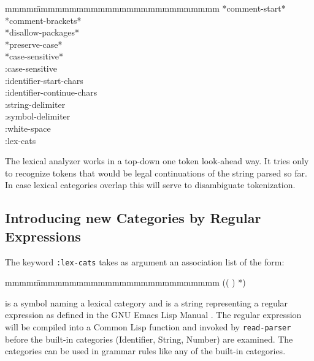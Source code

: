 {\tt \begin{tabbing}
mmmm\=mmmmmmmmmmmmmmmmmmmmmmmmmm\kill
    \>*comment-start*\\
    \>*comment-brackets*\\
    \>*disallow-packages*\\
    \>*preserve-case*\\
    \>*case-sensitive*\\
    \>:case-sensitive\\
    \>:identifier-start-chars\\
    \>:identifier-continue-chars\\
    \>:string-delimiter\\
    \>:symbol-delimiter\\
    \>:white-space \\
    \>:lex-cats \\
\end{tabbing}
}

The lexical analyzer works in a top-down one token look-ahead way.  It
tries only to recognize tokens that would be legal continuations of
the string parsed so far.  In case lexical categories overlap this
will serve to disambiguate tokenization.


\subsection{Introducing new Categories by Regular Expressions}
\label{lex-cats} 

The keyword {\tt :lex-cats} takes as argument an association list of
the form:
{\tt \begin{tabbing}
mmmm\=mmmmmmmmmmmmmmmmmmmmmmmmmm\kill
 \>(( ) *)
     \end{tabbing}
}

 is a symbol naming a lexical category and
 is a string representing a regular
expression as defined in the GNU Emacs Lisp Manual \cite{cs:GNULisp}.
The regular expression will be compiled into a Common Lisp function
and invoked by {\tt read-parser} before the built-in categories
(Identifier, String, Number) are examined.  The categories can be used
in grammar rules like any of the built-in categories.

